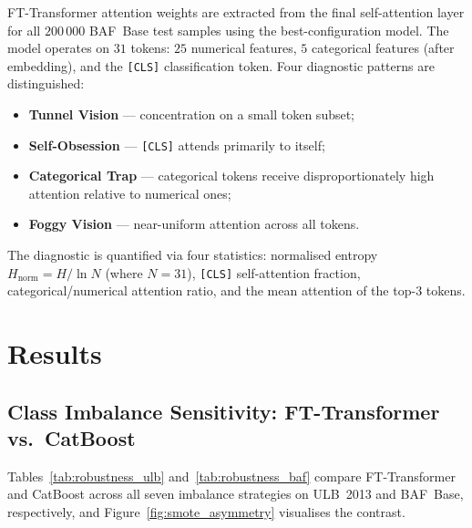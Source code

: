 \documentclass[a4paper,fleqn]{cas-sc}
\begin{document}
FT-Transformer attention weights are extracted from the final self-attention
layer for all $200\,000$ BAF~Base test samples using the best-configuration model.
The model operates on $31$ tokens: $25$ numerical features, $5$ categorical
features (after embedding), and the \texttt{[CLS]} classification token.
Four diagnostic patterns are distinguished:
\begin{itemize}[nosep]
  \item \textbf{Tunnel Vision} --- concentration on a small token subset;
  \item \textbf{Self-Obsession} --- \texttt{[CLS]} attends primarily to itself;
  \item \textbf{Categorical Trap} --- categorical tokens receive disproportionately
    high attention relative to numerical ones;
  \item \textbf{Foggy Vision} --- near-uniform attention across all tokens.
\end{itemize}
The diagnostic is quantified via four statistics:
normalised entropy $H_{\text{norm}} = H / \ln N$ (where $N=31$),
\texttt{[CLS]} self-attention fraction, categorical/numerical attention ratio,
and the mean attention of the top-$3$ tokens.


\section{Results}
\label{sec:results}

\subsection{Class Imbalance Sensitivity: FT-Transformer vs.\ CatBoost}
\label{sec:imbalance_sensitivity}

Tables~\ref{tab:robustness_ulb} and~\ref{tab:robustness_baf} compare
FT-Transformer and CatBoost across all seven imbalance strategies on ULB~2013 and
BAF~Base, respectively, and Figure~\ref{fig:smote_asymmetry} visualises the contrast.
\end{document}
